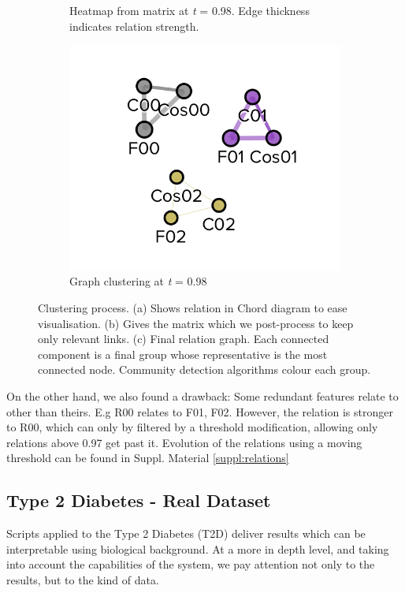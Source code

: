 \begin{figure}[!hb]
\begin{subfigure}[b]{0.3\linewidth}
		\caption{Heatmap from matrix at \emph{t} = 0.98. Edge thickness indicates relation strength.}
	\end{subfigure}
	\hfill
	\begin{subfigure}[b]{0.3\linewidth}
		\includegraphics[width=\linewidth]{Minor Thesis/figures/graphs/graph-toy.png}
		\caption{Graph clustering at \emph{t} = 0.98}
	\end{subfigure}
	\caption{Clustering process. (a) Shows relation in Chord diagram to ease visualisation. (b) Gives the matrix which we post-process to keep only relevant links. (c) Final relation graph. Each connected component is a final group whose representative is the most connected node. Community detection algorithms colour each group.}
	\label{fig:triade}
\end{figure}

On the other hand, we also found a drawback: Some redundant features relate to other than theirs. E.g R00 relates to F01, F02. However, the relation is stronger to R00, which can only by filtered by a threshold modification, allowing only relations above 0.97 get past it. Evolution of the relations using a moving threshold can be found in Suppl. Material \ref{suppl:relations}



\subsection{Type 2 Diabetes - Real Dataset}
Scripts applied to the Type 2 Diabetes (T2D) deliver results which can be interpretable using biological background. At a more in depth level, and taking into account the capabilities of the system, we pay attention not only to the results, but to the kind of data.
\\

